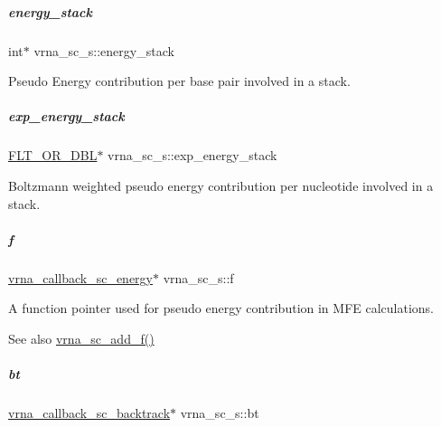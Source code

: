 \mbox{\label{group__soft__constraints_ac20dded6068e81acd0f1139092f66a22}} 
\subparagraph{\texorpdfstring{energy\+\_\+stack}{energy\_stack}}
{\footnotesize\ttfamily int$\ast$ vrna\+\_\+sc\+\_\+s\+::energy\+\_\+stack}



Pseudo Energy contribution per base pair involved in a stack. 

\mbox{\label{group__soft__constraints_a4a0058fe3d5ba3416f0aaab677610115}} 
\subparagraph{\texorpdfstring{exp\+\_\+energy\+\_\+stack}{exp\_energy\_stack}}
{\footnotesize\ttfamily \mbox{\hyperlink{group__data__structures_ga31125aeace516926bf7f251f759b6126}{F\+L\+T\+\_\+\+O\+R\+\_\+\+D\+BL}}$\ast$ vrna\+\_\+sc\+\_\+s\+::exp\+\_\+energy\+\_\+stack}



Boltzmann weighted pseudo energy contribution per nucleotide involved in a stack. 

\mbox{\label{group__soft__constraints_a32dc86090237888c75491bbd4861a04b}} 
\subparagraph{\texorpdfstring{f}{f}}
{\footnotesize\ttfamily \mbox{\hyperlink{group__soft__constraints_ga88a266695d9e25cc12114dceb7b4565e}{vrna\+\_\+callback\+\_\+sc\+\_\+energy}}$\ast$ vrna\+\_\+sc\+\_\+s\+::f}



A function pointer used for pseudo energy contribution in M\+FE calculations. 

\begin{DoxySeeAlso}{See also}
\mbox{\hyperlink{group__soft__constraints_ga8c7d907ec0125cd61c04e0908010a4e9}{vrna\+\_\+sc\+\_\+add\+\_\+f()}} 
\end{DoxySeeAlso}
\mbox{\label{group__soft__constraints_a2a2aca01782c2b980d7b7fd05b9be89c}} 
\subparagraph{\texorpdfstring{bt}{bt}}
{\footnotesize\ttfamily \mbox{\hyperlink{group__soft__constraints_gaeb6448da6c593d4c489c7fbadcb99499}{vrna\+\_\+callback\+\_\+sc\+\_\+backtrack}}$\ast$ vrna\+\_\+sc\+\_\+s\+::bt}



